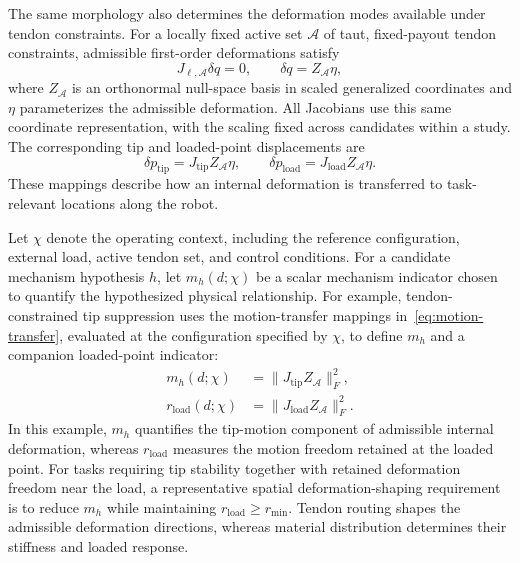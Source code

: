 The same morphology also determines the deformation modes available under tendon constraints. For a locally fixed active set $\mathcal A$ of taut, fixed-payout tendon constraints, admissible first-order deformations satisfy
\begin{equation}
J_{\ell,\mathcal A}\delta q=0,\qquad \delta q=Z_{\mathcal A}\eta,
\label{eq:deformation-space}
\end{equation}
where $Z_{\mathcal A}$ is an orthonormal null-space basis in scaled generalized coordinates and $\eta$ parameterizes the admissible deformation. All Jacobians use this same coordinate representation, with the scaling fixed across candidates within a study. The corresponding tip and loaded-point displacements are
\begin{equation}
\delta p_{\mathrm{tip}}=J_{\mathrm{tip}}Z_{\mathcal A}\eta,\qquad
\delta p_{\mathrm{load}}=J_{\mathrm{load}}Z_{\mathcal A}\eta.
\label{eq:motion-transfer}
\end{equation}
These mappings describe how an internal deformation is transferred to task-relevant locations along the robot.

Let $\chi$ denote the operating context, including the reference configuration, external load, active tendon set, and control conditions. For a candidate mechanism hypothesis $h$, let $m_h(d;\chi)$ be a scalar mechanism indicator chosen to quantify the hypothesized physical relationship. For example, tendon-constrained tip suppression uses the motion-transfer mappings in~\eqref{eq:motion-transfer}, evaluated at the configuration specified by $\chi$, to define $m_h$ and a companion loaded-point indicator:
\begin{equation}
\begin{aligned}
m_h(d;\chi)&=\|J_{\mathrm{tip}}Z_{\mathcal A}\|_F^2,\\
r_{\mathrm{load}}(d;\chi)&=\|J_{\mathrm{load}}Z_{\mathcal A}\|_F^2.
\end{aligned}
\label{eq:m0-indicator}
\end{equation}
In this example, $m_h$ quantifies the tip-motion component of admissible internal deformation, whereas $r_{\mathrm{load}}$ measures the motion freedom retained at the loaded point. For tasks requiring tip stability together with retained deformation freedom near the load, a representative spatial deformation-shaping requirement is to reduce $m_h$ while maintaining $r_{\mathrm{load}}\geq r_{\min}$. Tendon routing shapes the admissible deformation directions, whereas material distribution determines their stiffness and loaded response.

